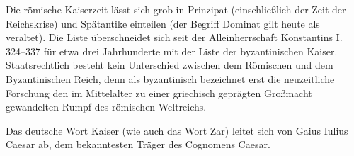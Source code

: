 Die römische Kaiserzeit lässt sich grob in Prinzipat (einschließlich der Zeit der Reichskrise) und Spätantike einteilen (der Begriff Dominat gilt heute als veraltet). Die Liste überschneidet sich seit der Alleinherrschaft Konstantins I. 324–337 für etwa drei Jahrhunderte mit der Liste der byzantinischen Kaiser. Staatsrechtlich besteht kein Unterschied zwischen dem Römischen und dem Byzantinischen Reich, denn als byzantinisch bezeichnet erst die neuzeitliche Forschung den im Mittelalter zu einer griechisch geprägten Großmacht gewandelten Rumpf des römischen Weltreichs.

Das deutsche Wort Kaiser (wie auch das Wort Zar) leitet sich von Gaius Iulius Caesar ab, dem bekanntesten Träger des Cognomens Caesar.


